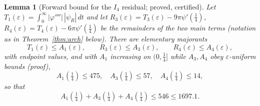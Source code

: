 \documentclass[11pt]{article}
\newtheorem{lemma}[theorem]{Lemma}
\newcommand{\psiR}{\psi_{R}}                %
\begin{document}
\begin{lemma}[Forward bound for the $I_4$ residual; proved, certified]\label{lem:resid}
Let $T_1(\varepsilon)=\int_0^\infty|\varphi''''|\,|\psiR|\,dt$ and let
$R_3(\varepsilon)=T_3(\varepsilon)-9\pi\psi'(\tfrac14)$,
$R_4(\varepsilon)=T_4(\varepsilon)-6\pi\psi'(\tfrac14)$ be the remainders of
the two main terms (notation as in Theorem~\ref{thm:arch} below). There are
elementary majorants
\[
T_1(\varepsilon)\le A_1(\varepsilon),\qquad
R_3(\varepsilon)\le A_3(\varepsilon),\qquad
R_4(\varepsilon)\le A_4(\varepsilon),
\]
with endpoint values, and with $A_1$ increasing on $(0,\tfrac14]$ while
$A_3,A_4$ obey $\varepsilon$-uniform bounds (proof),
\[
A_1(\tfrac14)\le 475,\quad A_3(\tfrac14)\le 57,\quad A_4(\tfrac14)\le 14,
\]
so that
\[
A_1(\tfrac14)+A_3(\tfrac14)+A_4(\tfrac14)\le 546\le 1697.1 .
\]
\end{lemma}
\end{document}

